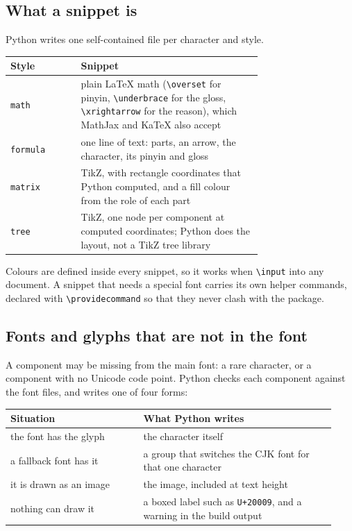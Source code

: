 \documentclass[11pt]{article}
\newcommand{\cmd}[1]{\texttt{\textbackslash #1}}               %
\begin{document}
\subsection{What a snippet is}
Python writes one self-contained file per character and style.

\begin{center}
\small
\begin{tabular}{@{}lp{0.72\linewidth}@{}}
\toprule
Style & Snippet \\
\midrule
\texttt{math}    & plain \LaTeX{} math (\cmd{overset} for pinyin, \cmd{underbrace} for the gloss, \cmd{xrightarrow} for the reason), which MathJax and KaTeX also accept \\
\texttt{formula} & one line of text: parts, an arrow, the character, its pinyin and gloss \\
\texttt{matrix}  & TikZ, with rectangle coordinates that Python computed, and a fill colour from the role of each part \\
\texttt{tree}    & TikZ, one node per component at computed coordinates; Python does the layout, not a TikZ tree library \\
\bottomrule
\end{tabular}
\end{center}
Colours are defined inside every snippet, so it works when \cmd{input} into any document. A snippet that needs a special font carries its own helper commands, declared with \cmd{providecommand} so that they never clash with the package.

\subsection{Fonts and glyphs that are not in the font}
A component may be missing from the main font: a rare character, or a component with no Unicode code point. Python checks each component against the font files, and writes one of four forms:

\begin{center}
\small
\begin{tabular}{@{}p{0.38\linewidth}p{0.55\linewidth}@{}}
\toprule
Situation & What Python writes \\
\midrule
the font has the glyph      & the character itself \\
a fallback font has it      & a group that switches the CJK font for that one character \\
it is drawn as an image     & the image, included at text height \\
nothing can draw it         & a boxed label such as \texttt{U+20009}, and a warning in the build output \\
\bottomrule
\end{tabular}
\end{center}
\end{document}
